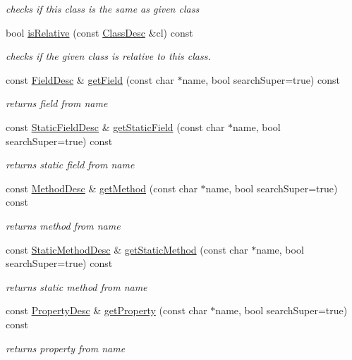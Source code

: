 \begin{DoxyCompactItemize}
\begin{DoxyCompactList}\small\item\em checks if this class is the same as given class \end{DoxyCompactList}\item 
bool \hyperlink{classagm_1_1reflection_1_1_class_desc_a12ecf46b1bc729f34e8d43f6e20db191}{is\+Relative} (const \hyperlink{classagm_1_1reflection_1_1_class_desc}{Class\+Desc} \&cl) const 
\begin{DoxyCompactList}\small\item\em checks if the given class is relative to this class. \end{DoxyCompactList}\item 
const \hyperlink{classagm_1_1reflection_1_1_field_desc}{Field\+Desc} \& \hyperlink{classagm_1_1reflection_1_1_class_desc_a2e58760e87e738943acdf815e42a4fb1}{get\+Field} (const char $\ast$name, bool search\+Super=true) const 
\begin{DoxyCompactList}\small\item\em returns field from name \end{DoxyCompactList}\item 
const \hyperlink{classagm_1_1reflection_1_1_static_field_desc}{Static\+Field\+Desc} \& \hyperlink{classagm_1_1reflection_1_1_class_desc_a8c2429617d0839f4c76d0e7c65398736}{get\+Static\+Field} (const char $\ast$name, bool search\+Super=true) const 
\begin{DoxyCompactList}\small\item\em returns static field from name \end{DoxyCompactList}\item 
const \hyperlink{classagm_1_1reflection_1_1_method_desc}{Method\+Desc} \& \hyperlink{classagm_1_1reflection_1_1_class_desc_afb8700570c2b8052483023e3e89728c2}{get\+Method} (const char $\ast$name, bool search\+Super=true) const 
\begin{DoxyCompactList}\small\item\em returns method from name \end{DoxyCompactList}\item 
const \hyperlink{classagm_1_1reflection_1_1_static_method_desc}{Static\+Method\+Desc} \& \hyperlink{classagm_1_1reflection_1_1_class_desc_ae58cfca99a11e6daf77eec6d634a0788}{get\+Static\+Method} (const char $\ast$name, bool search\+Super=true) const 
\begin{DoxyCompactList}\small\item\em returns static method from name \end{DoxyCompactList}\item 
const \hyperlink{classagm_1_1reflection_1_1_property_desc}{Property\+Desc} \& \hyperlink{classagm_1_1reflection_1_1_class_desc_a9fdc8339fdc1824e9bc3652136bab0a5}{get\+Property} (const char $\ast$name, bool search\+Super=true) const 
\begin{DoxyCompactList}\small\item\em returns property from name \end{DoxyCompactList}\end{DoxyCompactItemize}
